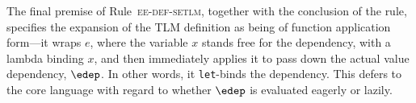 \documentclass[acmsmall]{acmart}
\newcommand{\li}[1]{\lstinline[basicstyle=\ttfamily\fontsize{9pt}{1em}\selectfont]{#1}}
\begin{document}
The final premise of Rule~\textsc{ee-def-setlm}, together with the conclusion of the rule, specifies the expansion of the TLM definition as being of function application form---it wraps $e$, where the variable $x$ stands free for the dependency, with a lambda binding $x$, and then immediately applies it to pass down the actual value dependency, $\edep$. In other words, it \li{let}-binds the dependency. This defers to the core language with regard to whether $\edep$ is evaluated eagerly or lazily.








\end{document}
